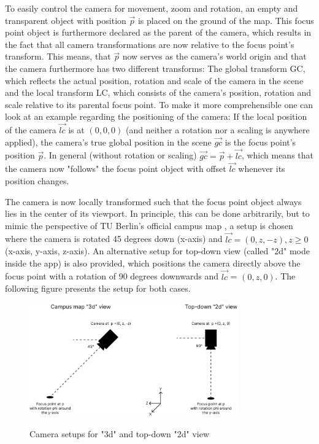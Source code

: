 To easily control the camera for movement, zoom and rotation, an empty and transparent object with position $\overrightarrow{p}$ is placed on the ground of the map. This focus point object is furthermore declared as the parent of the camera, which results in the fact that all camera transformations are now relative to the focus point's transform. This means, that $\overrightarrow{p}$ now serves as the camera's world origin and that the camera furthermore has two different transforms: The global transform GC, which reflects the actual position, rotation and scale of the camera in the scene and the local transform LC, which consists of the camera's position, rotation and scale relative to its parental focus point. To make it more comprehensible one can look at an example regarding the positioning of the camera: If the local position of the camera $\overrightarrow{lc}$ is at $(0, 0, 0)$ (and neither a rotation nor a scaling is anywhere applied), the camera's true global position in the scene $\overrightarrow{gc}$ is the focus point's position $\overrightarrow{p}$. In general (without rotation or scaling) $\overrightarrow{gc} = \overrightarrow{p} + \overrightarrow{lc}$, which means that the camera now "follows" the focus point object with offset $\overrightarrow{lc}$ whenever its position changes.

The camera is now locally transformed such that the focus point object always lies in the center of its viewport. In principle, this can be done arbitrarily, but to mimic the perspective of TU Berlin's official campus map \cite{campus_plan}, a setup is chosen where the camera is rotated 45 degrees down (x-axis) and $\overrightarrow{lc} = (0, z, -z), z \geq 0$ (x-axis, y-axis, z-axis). An alternative setup for top-down view (called "2d" mode inside the app) is also provided, which positions the camera directly above the focus point with a rotation of 90 degrees downwards and $\overrightarrow{lc}$ = $(0, z, 0)$. The following figure presents the setup for both cases.

\begin{figure}[H]
	\centering
	\includegraphics[width=0.8\textwidth]{images/camera_setup.png}\\
	\caption{Camera setups for "3d" and top-down "2d" view}
\end{figure}


